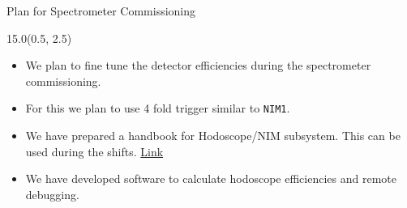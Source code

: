 \documentclass[12pt, xcolor={dvipsnames}, aspectratio = 169, sans,mathserif]{beamer}
\newenvironment{List}[2]
{
\begin{textblock}{#1}#2
\begin{itemize}
}
{
\end{itemize}
\end{textblock}
}
\begin{document}
\begin{frame}[fragile]{Plan for Spectrometer Commissioning}
\begin{List}{15.0}{(0.5, 2.5)}

  \item We plan to fine tune the detector efficiencies during the spectrometer commissioning.

  \item For this we plan to use 4 fold trigger similar to \verb|NIM1|.

  \item We have prepared a handbook for Hodoscope/NIM subsystem. This can be used during the shifts. \href{https://github.com/dinupa1/NIM_Hodo_Handbook/blob/main/NIM_Hodo_Handbook.pdf}{Link}

  \item We have developed software to calculate hodoscope efficiencies and remote debugging.

\end{List}
\end{frame}
\end{document}
